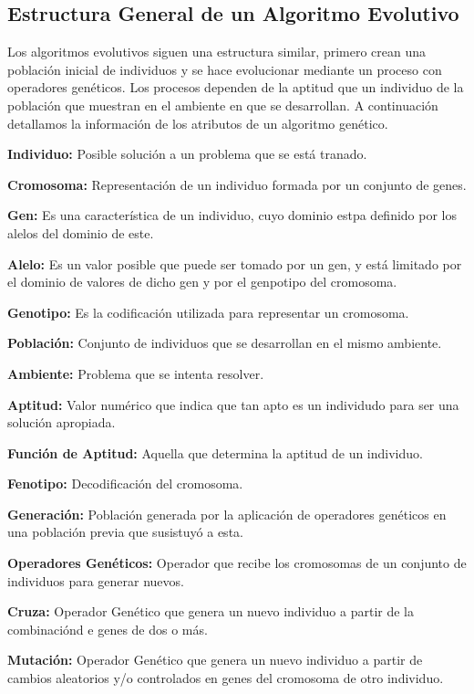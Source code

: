 		\subsection{Estructura General de un Algoritmo Evolutivo}

		Los algoritmos evolutivos siguen una estructura similar, primero crean una población inicial de individuos y se hace evolucionar mediante un proceso con operadores genéticos. Los procesos dependen de la aptitud que un individuo de la población que muestran en el ambiente en que se desarrollan. A continuación detallamos la información de los atributos de un algoritmo genético.

		\textbf{Individuo:} Posible solución a un problema que se está tranado.

		\textbf{Cromosoma:} Representación de un individuo formada por un conjunto de genes.

		\textbf{Gen:} Es una característica de un individuo, cuyo dominio estpa definido por los alelos del dominio de este.

		\textbf{Alelo:} Es un valor posible que puede ser tomado por un gen, y está limitado por el dominio de valores de dicho gen y por el genpotipo del cromosoma.

		\textbf{Genotipo:} Es la codificación utilizada para representar un cromosoma.

		\textbf{Población:} Conjunto de individuos que se desarrollan en el mismo ambiente.

		\textbf{Ambiente:} Problema que se intenta resolver.

		\textbf{Aptitud:} Valor numérico que indica que tan apto es un individudo para ser una solución apropiada.

		\textbf{Función de Aptitud:} Aquella que determina la aptitud de un individuo.

		\textbf{Fenotipo:} Decodificación del cromosoma.

		\textbf{Generación:} Población generada por la aplicación de operadores genéticos en una población previa que susistuyó a esta.

		\textbf{Operadores Genéticos:} Operador que recibe los cromosomas de un conjunto de individuos para generar nuevos.

		\textbf{Cruza:} Operador Genético que genera un nuevo individuo a partir de la combinaciónd e genes de dos o más.

		\textbf{Mutación:} Operador Genético que genera un nuevo individuo a partir de cambios aleatorios y/o controlados en genes del cromosoma de otro individuo.

